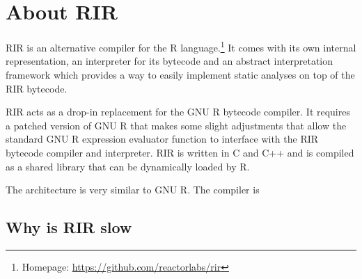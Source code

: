 \chapter{About RIR\label{rir}}

RIR is an alternative compiler for the R language.\footnote{Homepage: \url{https://github.com/reactorlabs/rir}} It comes with its own internal representation, an interpreter for its bytecode and an abstract interpretation framework which provides a way to easily implement static analyses on top of the RIR bytecode.


RIR acts as a drop-in replacement for the GNU R bytecode compiler. It requires a patched version of GNU R that makes some slight adjustments that allow the standard GNU R expression evaluator function to interface with the RIR bytecode compiler and interpreter. RIR is written in C and C++ and is compiled as a shared library that can be dynamically loaded by R.

The architecture is very similar to GNU R. The compiler is 




\todo[guards]



\section{Why is RIR slow}

